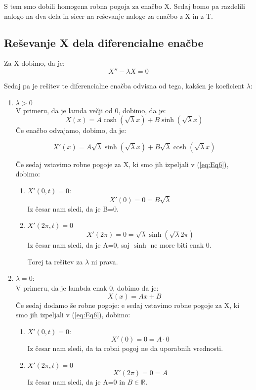 \documentclass[11pt, a4paper]{article}
\theoremstyle{definition}
\theoremstyle{example}
\theoremstyle{izrek}
\begin{document}
S tem smo dobili homogena robna pogoja za enačbo X. Sedaj bomo pa razdelili nalogo na dva dela in sicer na reševanje naloge za enačbo z X in z T.
\subsection{Reševanje X dela diferencialne enačbe}
Za X dobimo, da je:
\begin{equation}
\label{eq:Eq7}
X''-\lambda X=0
\end{equation}

Sedaj pa je rešitev te diferencialne enačba odvisna od tega, kakšen je koeficient $\lambda$:
\begin{enumerate}
\item \texttt{$\lambda >0$}\\
V primeru, da je lamda večji od 0, dobimo, da je: 
\begin{equation}
\label{eq:Eq8}
X(x)=A\cosh (\sqrt{\lambda}x)+B\sinh (\sqrt{\lambda}x)
\end{equation}
Če enačbo odvajamo, dobimo, da je:

$$X'(x)=A\sqrt{\lambda}\sinh (\sqrt{\lambda}x) + B\sqrt{\lambda}\cosh( \sqrt{\lambda}x)$$

Če sedaj vstavimo robne pogoje za X, ki smo jih izpeljali v (\ref{eq:Eq6}), dobimo:
\begin{enumerate}
\item $X'(0,t)=0$:  \\
\begin{equation}
\label{eq:Eq9}
X'(0)=0=B\sqrt{\lambda}
\end{equation}
Iz česar nam sledi, da je B=0.
\item $X'(2 \pi,t)=0$
\begin{equation}
\label{eq:Eq10}
X'(2 \pi)=0=\sqrt{\lambda}\sinh(\sqrt{\lambda}2\pi)
\end{equation}
Iz česar nam sledi, da je A=0, saj $\sinh$ ne more biti enak 0.

Torej ta rešitev za $\lambda$ ni prava.
\end{enumerate}

\item $\lambda=0$: \\
V primeru, da je lambda enak 0, dobimo da je: 
\begin{equation}
\label{eq:Eq11}
X(x)=Ax+B
\end{equation}
Če sedaj dodamo še robne pogoje:
e sedaj vstavimo robne pogoje za X, ki smo jih izpeljali v (\ref{eq:Eq6}), dobimo:
\begin{enumerate}
\item $X'(0,t)=0$:  \\
\begin{equation}
\label{eq:Eq12}
X'(0)=0=A \cdot 0
\end{equation}
Iz česar nam sledi, da ta robni pogoj ne da uporabnih vrednosti.
\item $X'(2 \pi,t)=0$
\begin{equation}
\label{eq:Eq13}
X'(2 \pi)=0= A
\end{equation}
Iz česar nam sledi, da je A=0 in $B \in \mathbb{R}$.


\end{enumerate}
\end{enumerate}
\end{document}

